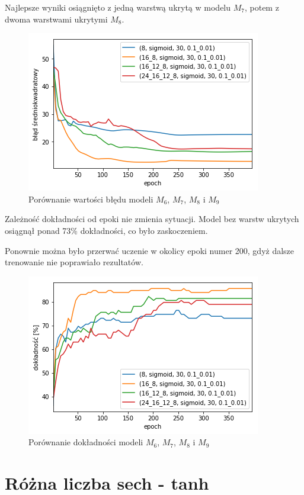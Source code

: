 \documentclass{report}
\begin{document}
    Najlepsze wyniki osiągnięto z jedną warstwą ukrytą w modelu $M_7$, potem z dwoma warstwami ukrytymi $M_8$.

    \begin{figure}[htp]
        \centering
        \includegraphics[scale=0.8]{./img/arch-error.png}
        \caption{Porównanie wartości błędu modeli $M_6$, $M_7$, $M_8$ i $M_9$}
    \end{figure}

    Zależność dokładności od epoki nie zmienia sytuacji.
    Model bez warstw ukrytych osiągnął ponad 73\% dokładności, co było zaskoczeniem.

    Ponownie można było przerwać uczenie w okolicy epoki numer 200, gdyż dalsze trenowanie nie poprawiało rezultatów.

    \begin{figure}[htp]
        \centering
        \includegraphics[scale=0.8]{./img/arch-accuracy.png}
        \caption{Porównanie dokładności modeli $M_6$, $M_7$, $M_8$ i $M_9$}
    \end{figure}

    \section{Różna liczba sech - tanh}\label{sec:różnaLiczbaSech-Tanh}
\end{document}
